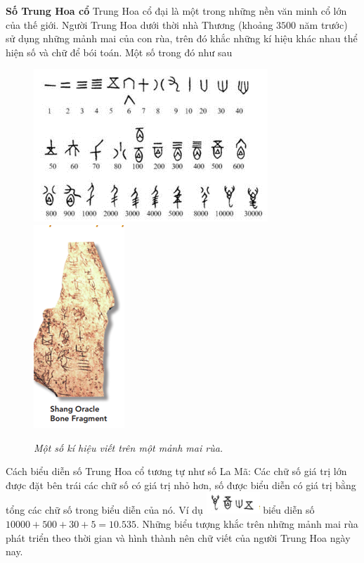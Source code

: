	\vskip 0.1cm
	\textbf{\color{toancuabi}Số Trung Hoa cổ}
	\vskip 0.1cm
	Trung Hoa cổ đại là một trong những nền văn minh cổ lớn của thế giới. Người Trung Hoa dưới thời nhà Thương (khoảng $3500$ năm trước) sử dụng những mảnh mai của con rùa, trên đó khắc những kí hiệu khác nhau thể hiện số và chữ để bói toán. Một số trong đó như sau
	\begin{figure}[H]
		\centering
		\vspace*{-5pt}
		\captionsetup{labelformat= empty, justification=centering}
		\includegraphics[height=0.4\linewidth]{40}\quad
		\includegraphics[height=0.4\linewidth]{41}
			\caption{\textit{\color{toancuabi}Một số kí hiệu viết trên một mảnh mai rùa.}}
		\vspace*{-10pt}
	\end{figure}
	Cách biểu diễn số Trung Hoa cổ tương tự như số La Mã: Các chữ số giá trị lớn được đặt bên trái các chữ số có  giá trị nhỏ hơn, số được biểu diễn có giá trị bằng tổng các chữ số trong biểu diễn của nó. Ví dụ \includegraphics{42} biểu diễn số $10000 + 500 + 30 + 5 =10{.}535$. Những biểu tượng khắc trên những mảnh mai rùa phát triển theo thời gian và hình thành nên chữ viết của người Trung Hoa ngày nay. 
	\vskip 0.1cm
